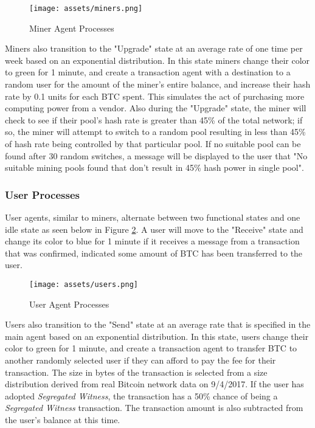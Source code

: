 \documentclass[12pt]{report}
\begin{document}
\begin{figure}[h!]
\begin{center}
\texttt{[image: assets/miners.png]}
\end{center}
\caption{Miner Agent Processes}
\label{fig:miner}
\end{figure}

Miners also transition to the "Upgrade" state at an average rate of one time per week based on an exponential distribution. In this state miners change their color to green for 1 minute, and create a transaction agent with a destination to a random user for the amount of the miner's entire balance, and increase their hash rate by 0.1 units for each BTC spent. This simulates the act of purchasing more computing power from a vendor. Also during the "Upgrade" state, the miner will check to see if their pool's hash rate is greater than 45\% of the total network; if so, the miner will attempt to switch to a random pool resulting in less than 45\% of hash rate being controlled by that particular pool. If no suitable pool can be found after 30 random switches, a message will be displayed to the user that "No suitable mining pools found that don't result in 45\% hash power in single pool".

\subsubsection{User Processes}
User agents, similar to miners, alternate between two functional states and one idle state as seen below in Figure \ref{fig:user}. A user will move to the "Receive" state and change its color to blue for 1 minute if it receives a message from a transaction that was confirmed, indicated some amount of BTC has been transferred to the user.

\begin{figure}[h!]
\texttt{[image: assets/users.png]}
\caption{User Agent Processes}
\label{fig:user}
\end{figure}

Users also transition to the "Send" state at an average rate that is specified in the main agent based on an exponential distribution. In this state, users change their color to green for 1 minute, and create a transaction agent to transfer BTC to another randomly selected user if they can afford to pay the fee for their transaction. The size in bytes of the transaction is selected from a size distribution derived from real Bitcoin network data \cite{TradeBlock.com.} on 9/4/2017. If the user has adopted \textit{Segregated Witness}, the transaction has a 50\% chance of being a \textit{Segregated Witness} transaction. The transaction amount is also subtracted from the user's balance at this time.
\end{document}
